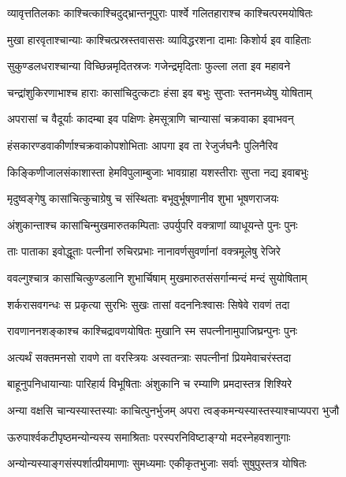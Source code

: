 \twolineshloka
{व्यावृत्ततिलकाः काश्चित्काश्चिदुद्भ्रान्तनूपुराः}
{पार्श्वे गलितहाराश्च काश्चित्परमयोषितः} %

\twolineshloka
{मुखा हारवृताश्चान्याः काश्चित्प्रस्रस्तवाससः}
{व्याविद्धरशना दामाः किशोर्य इव वाहिताः} %

\twolineshloka
{सुकुण्डलधराश्चान्या विच्छिन्नमृदितस्रजः}
{गजेन्द्रमृदिताः फुल्ला लता इव महावने} %

\twolineshloka
{चन्द्रांशुकिरणाभाश्च हाराः कासांचिदुत्कटाः}
{हंसा इव बभुः सुप्ताः स्तनमध्येषु योषिताम्} %

\twolineshloka
{अपरासां च वैदूर्याः कादम्बा इव पक्षिणः}
{हेमसूत्राणि चान्यासां चक्रवाका इवाभवन्} %

\twolineshloka
{हंसकारण्डवाकीर्णाश्चक्रवाकोपशोभिताः}
{आपगा इव ता रेजुर्जघनैः पुलिनैरिव} %

\twolineshloka
{किङ्किणीजालसंकाशास्ता हेमविपुलाम्बुजाः}
{भावग्राहा यशस्तीराः सुप्ता नद्य इवाबभुः} %

\twolineshloka
{मृदुष्वङ्गेषु कासांचित्कुचाग्रेषु च संस्थिताः}
{बभूवुर्भूषणानीव शुभा भूषणराजयः} %

\twolineshloka
{अंशुकान्ताश्च कासांचिन्मुखमारुतकम्पिताः}
{उपर्युपरि वक्त्राणां व्याधूयन्ते पुनः पुनः} %

\twolineshloka
{ताः पाताका इवोद्धूताः पत्नीनां रुचिरप्रभाः}
{नानावर्णसुवर्णानां वक्त्रमूलेषु रेजिरे} %

\twolineshloka
{ववल्गुश्चात्र कासांचित्कुण्डलानि शुभार्चिषाम्}
{मुखमारुतसंसर्गान्मन्दं मन्दं सुयोषिताम्} %

\twolineshloka
{शर्करासवगन्धः स प्रकृत्या सुरभिः सुखः}
{तासां वदननिःश्वासः सिषेवे रावणं तदा} %

\twolineshloka
{रावणाननशङ्काश्च काश्चिद्रावणयोषितः}
{मुखानि स्म सपत्नीनामुपाजिघ्रन्पुनः पुनः} %

\twolineshloka
{अत्यर्थं सक्तमनसो रावणे ता वरस्त्रियः}
{अस्वतन्त्राः सपत्नीनां प्रियमेवाचरंस्तदा} %

\twolineshloka
{बाहूनुपनिधायान्याः पारिहार्य विभूषिताः}
{अंशुकानि च रम्याणि प्रमदास्तत्र शिश्यिरे} %

\twolineshloka
{अन्या वक्षसि चान्यस्यास्तस्याः काचित्पुनर्भुजम्}
{अपरा त्वङ्कमन्यस्यास्तस्याश्चाप्यपरा भुजौ} %

\twolineshloka
{ऊरुपार्श्वकटीपृष्ठमन्योन्यस्य समाश्रिताः}
{परस्परनिविष्टाङ्ग्यो मदस्नेहवशानुगाः} %

\twolineshloka
{अन्योन्यस्याङ्गसंस्पर्शात्प्रीयमाणाः सुमध्यमाः}
{एकीकृतभुजाः सर्वाः सुषुपुस्तत्र योषितः} %

